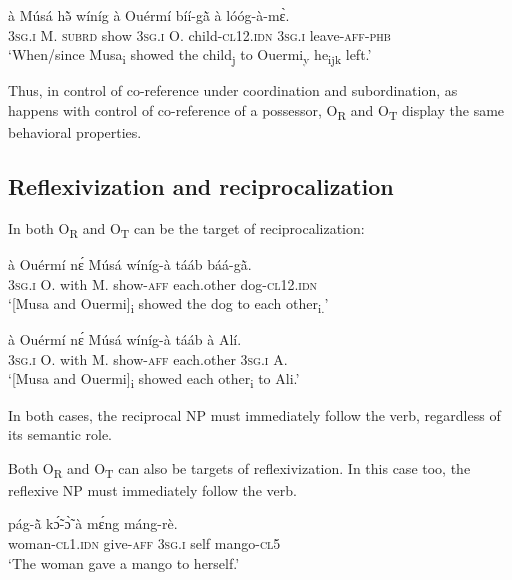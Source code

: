 \documentclass[output=paper]{langsci/langscibook}
\begin{document}
\ea
\label{ex:40.pacchiarotti}
\gll à Músá hə̃̀ wíníg à Ouérmí bíí-g\`{ã} à lóóg-à-mɛ̀.\\
\textsc{3sg.i}    M.  \textsc{subrd}    show  \textsc{3sg.i}    O.        child-\textsc{cl12.idn} \textsc{3sg.i}    leave-\textsc{aff-phb}\\
\glt `When/since Musa\textsubscript{i} showed the child\textsubscript{j} to Ouermi\textsubscript{y} he\textsubscript{ijk} left.'
\z

Thus, in control of co-reference under coordination and subordination, as happens with control of co-reference of a possessor, O\textsubscript{R} and O\textsubscript{T} display the same behavioral properties. 

\subsection{Reflexivization and reciprocalization}\label{§5.4:reflexivization.pacchiarotti}

In  both O\textsubscript{R}  and O\textsubscript{T}  can be the target of reciprocalization:

\ea
\label{ex:41.pacchiarotti}
\gll à    Ouérmí  nɛ́  Músá  wíníg-à  tááb    báá-g\`{ã}. \\
\textsc{3sg.i}    O.    with  M.  show-\textsc{aff}  each.other  dog-\textsc{cl12.idn}\\
\glt `[Musa and Ouermi]\textsubscript{i} showed the dog to each other\textsubscript{i.}'
\z

\ea
\label{ex:42.pacchiarotti}
\gll à    Ouérmí  nɛ́  Músá  wíníg-à  tááb    à    Alí.\\
\textsc{3sg.i}    O.    with  M.  show-\textsc{aff}  each.other  \textsc{3sg.i}     A.\\
\glt `[Musa and Ouermi]\textsubscript{i} showed each other\textsubscript{i} to Ali.'
\z

In both cases, the reciprocal NP must immediately follow the verb, regardless of its semantic role. 

Both O\textsubscript{R} and O\textsubscript{T} can also be targets of reflexivization. In this case too, the reflexive NP must immediately follow the verb.

\ea
\label{ex:43.pacchiarotti}
\gll pág-\`{ã} kɔ̃́-ɔ̃̀ à mɛ́ng máng-rè.\\
woman-\textsc{cl1.idn}  give-\textsc{aff}  \textsc{3sg.i}    self  mango-\textsc{cl5}\\
\glt `The woman gave a mango to herself.'
\z
\end{document}
